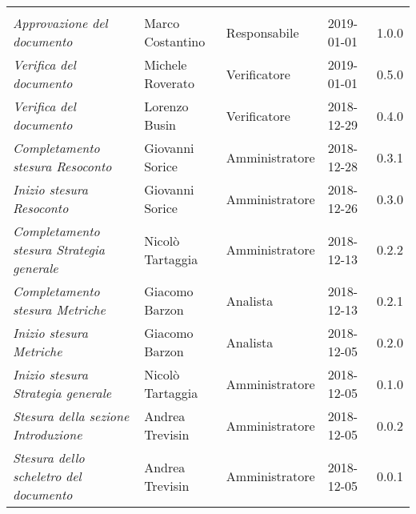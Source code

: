 \newpage 
\section*{}
\begin{table}[H]
	\centering
	\begin{tabular}{p{4cm}|C{3cm}|C{3cm}|R{2.5cm}|R{2cm}}
		
		 & & & & \\
		
		
		\emph{Approvazione del documento} & Marco Costantino & Responsabile & 2019-01-01 & 1.0.0 \\
		\hline
		
		\emph{Verifica del documento} & Michele Roverato & Verificatore & 2019-01-01 & 0.5.0 \\
		\hline
		
		\emph{Verifica del documento} & Lorenzo Busin & Verificatore & 2018-12-29 & 0.4.0 \\
		\hline
		
		\emph{Completamento stesura Resoconto} & Giovanni Sorice & Amministratore & 2018-12-28 & 0.3.1 \\
		\hline
		
		\emph{Inizio stesura Resoconto} & Giovanni Sorice & Amministratore & 2018-12-26 & 0.3.0 \\
		\hline
		
		\emph{Completamento stesura Strategia generale} & Nicolò Tartaggia & Amministratore & 2018-12-13 & 0.2.2 \\
		\hline
		
		\emph{Completamento stesura Metriche} & Giacomo Barzon & Analista & 2018-12-13 & 0.2.1 \\
		\hline
		
		\emph{Inizio stesura Metriche} & Giacomo Barzon & Analista & 2018-12-05 & 0.2.0 \\
		\hline
		
		\emph{Inizio stesura Strategia generale} & Nicolò Tartaggia & Amministratore & 2018-12-05 & 0.1.0 \\
		\hline
		
		\emph{Stesura della sezione Introduzione } & Andrea Trevisin & Amministratore & 2018-12-05 & 0.0.2 \\
		\hline
		
		\emph{Stesura dello scheletro del documento} & Andrea Trevisin & Amministratore & 2018-12-05 & 0.0.1 \\
		
	\end{tabular}
	
\end{table}


\clearpage